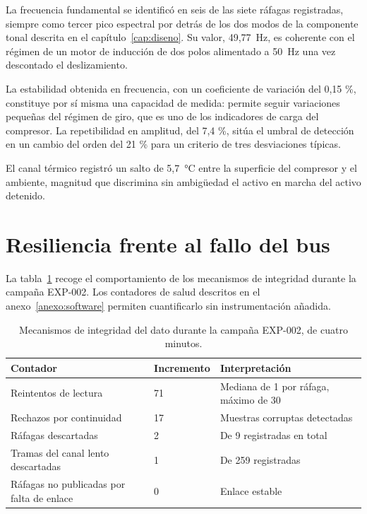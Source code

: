 La frecuencia fundamental se identificó en seis de las siete ráfagas registradas, siempre como
tercer pico espectral por detrás de los dos modos de la componente tonal descrita en el
capítulo~\ref{cap:diseno}. Su valor, \mbox{49,77 Hz}, es coherente con el régimen de un
motor de inducción de dos polos alimentado a \mbox{50 Hz} una vez descontado el
deslizamiento.

La estabilidad obtenida en frecuencia, con un coeficiente de variación del 0,15 \%,
constituye por sí misma una capacidad de medida: permite seguir variaciones pequeñas del
régimen de giro, que es uno de los indicadores de carga del compresor. La repetibilidad en
amplitud, del 7,4 \%, sitúa el umbral de detección en un cambio del orden del 21 \% para un
criterio de tres desviaciones típicas.

El canal térmico registró un salto de \mbox{5,7 °C} entre la superficie del compresor y el
ambiente, magnitud que discrimina sin ambigüedad el activo en marcha del activo detenido.
\section{Resiliencia frente al fallo del bus}

La tabla~\ref{table:resiliencia} recoge el comportamiento de los mecanismos de integridad
durante la campaña EXP-002. Los contadores de salud descritos en el anexo~\ref{anexo:software} permiten cuantificarlo sin instrumentación añadida.

\begin{table}[ht!]
\caption{Mecanismos de integridad del dato durante la campaña EXP-002, de cuatro minutos.}
\label{table:resiliencia}
\centering
\begin{tabular}{|p{5.6cm}|p{2.4cm}|p{4.0cm}|}
\hline
\textbf{Contador} & \textbf{Incremento} & \textbf{Interpretación} \\
\hline
Reintentos de lectura & 71 & Mediana de 1 por ráfaga, máximo de 30 \\
\hline
Rechazos por continuidad & 17 & Muestras corruptas detectadas \\
\hline
Ráfagas descartadas & 2 & De 9 registradas en total \\
\hline
Tramas del canal lento descartadas & 1 & De 259 registradas \\
\hline
Ráfagas no publicadas por falta de enlace & 0 & Enlace estable \\
\hline
\end{tabular}
\end{table}


